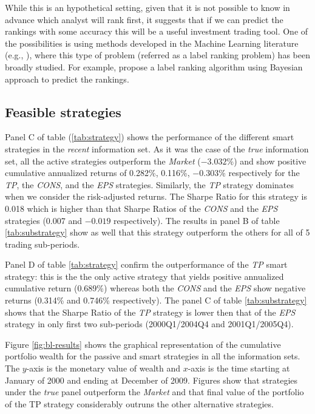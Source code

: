 \documentclass{article}\usepackage[]{graphicx}\usepackage[]{color}
\newcommand{\tr}{\textit{true}}
\newcommand{\naive}{\textit{recent}}
\begin{document}
While this is an hypothetical setting, given that it is not possible to know in advance which analyst will rank first, it suggests that if we can predict the rankings with some accuracy this will be a useful investment trading tool. One of the possibilities is using methods developed in the Machine Learning literature (e.g., \cite{aiguzhinov2010,brazdil2003}), where this type of problem (referred as a label ranking problem) has been broadly studied. For example, \cite{aiguzhinov2010} propose a label ranking algorithm using Bayesian approach to predict the rankings.



\subsection{Feasible strategies}
Panel C of table (\ref{tab:strategy}) shows the performance of the different smart strategies in the \naive{} information set. As it was the  case of the \tr{} information set, all the active strategies outperform the \textit{Market} (\ensuremath{-3.032}\%)  and show positive cumulative annualized returns of 0.282\%,  0.116\%, \ensuremath{-0.303}\% respectively for the \textit{TP}, the \textit{CONS}, and the \textit{EPS} strategies. Similarly, the \textit{TP} strategy dominates when we consider the risk-adjusted returns. The Sharpe Ratio for this strategy is 0.018 which is higher than that Sharpe Ratios of the \textit{CONS} and  the \textit{EPS} strategies  (0.007 and \ensuremath{-0.019} respectively). The results in panel B of table \ref{tab:substrategy} show as well that this strategy outperform the others for all of 5 trading sub-periods. 

Panel D of table \ref{tab:strategy} confirm the outperformance of the \textit{TP} smart strategy: this is the the only active strategy that yields positive annualized cumulative return (0.689\%) whereas both  the \textit{CONS} and the \textit{EPS} show negative returns (0.314\% and 0.746\% respectively). The panel C of table \ref{tab:substrategy} shows that the Sharpe Ratio of the \textit{TP} strategy is lower then that of the \textit{EPS} strategy in only first two sub-periods (2000Q1/2004Q4 and 2001Q1/2005Q4).


Figure \ref{fig:bl-results} shows the graphical representation of the cumulative portfolio wealth for  the passive and smart strategies in all the information sets. The $y$-axis is the monetary value of wealth and $x$-axis is the time starting at January of 2000 and ending at December of 2009. Figures show that strategies under the \tr{} panel outperform the \emph{Market} and that final value  of the portfolio of the TP strategy considerably outruns the other alternative strategies.
\end{document}

